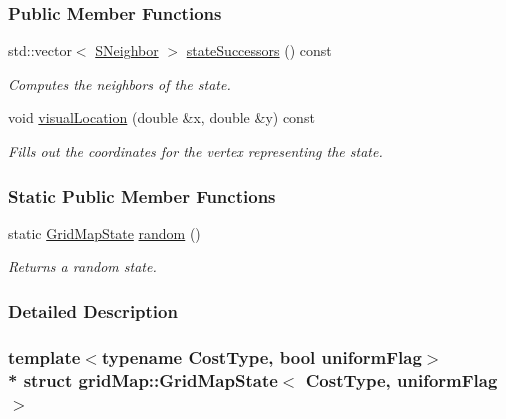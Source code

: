 \subsubsection*{Public Member Functions}
\begin{DoxyCompactItemize}
\item 
std\+::vector$<$ \hyperlink{structgridMap_1_1GridMapState_ae3f997c80d854a2fa6eae8f949263211}{S\+Neighbor} $>$ \hyperlink{structgridMap_1_1GridMapState_a51e51be8330d908b286a67c1be65b241}{state\+Successors} () const 
\begin{DoxyCompactList}\small\item\em Computes the neighbors of the state. \end{DoxyCompactList}\item 
void \hyperlink{structgridMap_1_1GridMapState_a99af798ed7930b5d07007ba4bb88a47c}{visual\+Location} (double \&x, double \&y) const 
\begin{DoxyCompactList}\small\item\em Fills out the coordinates for the vertex representing the state. \end{DoxyCompactList}\end{DoxyCompactItemize}
\subsubsection*{Static Public Member Functions}
\begin{DoxyCompactItemize}
\item 
static \hyperlink{structgridMap_1_1GridMapState}{Grid\+Map\+State} \hyperlink{structgridMap_1_1GridMapState_ac0a27a479d8e1e206400bb139a57df9f}{random} ()
\begin{DoxyCompactList}\small\item\em Returns a random state. \end{DoxyCompactList}\end{DoxyCompactItemize}


\subsubsection{Detailed Description}
\subsubsection*{template$<$typename Cost\+Type, bool uniform\+Flag$>$\\*
struct grid\+Map\+::\+Grid\+Map\+State$<$ Cost\+Type, uniform\+Flag $>$}

